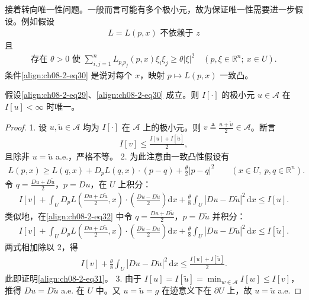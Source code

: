 \documentclass[../../main.tex]{subfiles}
\begin{document}
接着转向唯一性问题。一般而言可能有多个极小元，故为保证唯一性需要进一步假设。例如假设
\begin{align}
L=L(p,x)\text{ 不依赖于 }z\label{align:ch08-2-eq29}
\end{align}
且
\begin{align}
\text{存在 }\theta>0\text{ 使 }\sum_{i,j=1}^n L_{p_ip_j}(p,x)\xi_i\xi_j\geqslant\theta|\xi|^2\quad (p,\xi\in\mathbb{R}^n;\ x\in U).\label{align:ch08-2-eq30}
\end{align}
条件\eqref{align:ch08-2-eq30} 是说对每个 $x$，映射 $p\mapsto L(p,x)$ 一致凸。

\begin{theorem}[极小元的唯一性]\label{theorem:ch08-2-3-极小元唯一}
假设\eqref{align:ch08-2-eq29}、\eqref{align:ch08-2-eq30} 成立。则 $I[\cdot]$ 的极小元 $u\in\mathcal{A}$ 在 $I[u]<\infty$ 时唯一。
\begin{proof}
1. 设 $u,\widetilde{u}\in\mathcal{A}$ 均为 $I[\cdot]$ 在 $\mathcal{A}$ 上的极小元。则 $v\triangleq\frac{u+\widetilde{u}}2\in\mathcal{A}$。断言
\begin{align}
I[v]\leqslant\frac{I[u]+I[\widetilde{u}]}2,\label{align:ch08-2-eq31}
\end{align}
且除非 $u=\widetilde{u}$ a.e.，严格不等。
2. 为此注意由一致凸性假设有
\begin{align}
L(p,x)\geqslant L(q,x)+D_pL(q,x)\cdot(p-q)+\frac{\theta}{2}|p-q|^2\qquad (x\in U,\ p,q\in\mathbb{R}^n).\label{align:ch08-2-eq32}
\end{align}
令 $q=\frac{Du+D\widetilde{u}}2$，$p=Du$，在 $U$ 上积分：
\begin{align}
I[v]+\int_U D_pL\!\left(\frac{Du+D\widetilde{u}}2,x\right)\cdot\left(\frac{Du-D\widetilde{u}}2\right)\mathrm{d}x+\frac{\theta}{8}\int_U|Du-D\widetilde{u}|^2\,\mathrm{d}x\leqslant I[u].\label{align:ch08-2-eq33}
\end{align}
类似地，在\eqref{align:ch08-2-eq32} 中令 $q=\frac{Du+D\widetilde{u}}2$，$p=D\widetilde{u}$ 并积分：
\begin{align}
I[v]+\int_U D_pL\!\left(\frac{Du+D\widetilde{u}}2,x\right)\cdot\left(\frac{D\widetilde{u}-Du}2\right)\mathrm{d}x+\frac{\theta}{8}\int_U|Du-D\widetilde{u}|^2\,\mathrm{d}x\leqslant I[\widetilde{u}].\label{align:ch08-2-eq34}
\end{align}
两式相加除以 2，得
\begin{align*}
I[v]+\frac{\theta}{8}\int_U|Du-D\widetilde{u}|^2\,\mathrm{d}x\leqslant\frac{I[u]+I[\widetilde{u}]}2.
\end{align*}
此即证明\eqref{align:ch08-2-eq31}。
3. 由于 $I[u]=I[\widetilde{u}]=\min_{w\in\mathcal{A}}I[w]\leqslant I[v]$，推得 $Du=D\widetilde{u}$ a.e. 在 $U$ 中。又 $u=\widetilde{u}=g$ 在迹意义下在 $\partial U$ 上，故 $u=\widetilde{u}$ a.e.
\end{proof}
\end{theorem}
\end{document}
